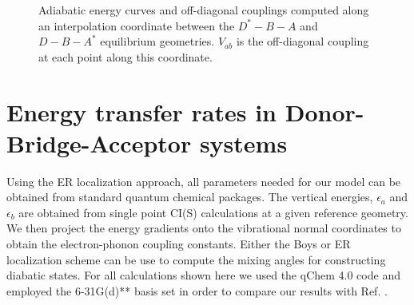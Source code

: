 \begin{figure}[t]
\caption{Adiabatic energy curves and off-diagonal couplings computed along an interpolation coordinate between the
$D^{*}-B-A$ and $D-B-A^{*}$ equilibrium geometries.  $V_{ab}$ is the off-diagonal coupling at each point along this coordinate.} \label{parabs}
\end{figure}





\section{Energy transfer rates in  Donor-Bridge-Acceptor systems}


Using the ER localization approach, all parameters needed for our model can be  obtained from
standard  quantum chemical packages.   The vertical energies, $\epsilon_{a}$
and $\epsilon_{b}$ are obtained from single point CI(S) calculations at a given
reference geometry.   We then project the energy gradients onto the vibrational normal
coordinates to obtain the electron-phonon coupling constants.  Either the Boys or ER
localization scheme can be use to compute the mixing
angles for constructing diabatic states. For all calculations shown here we
used the qChem 4.0 code and employed the 6-31G(d){*}{*} basis set
in order to compare our results  with  Ref. \cite{subotnik2010predicting}.

